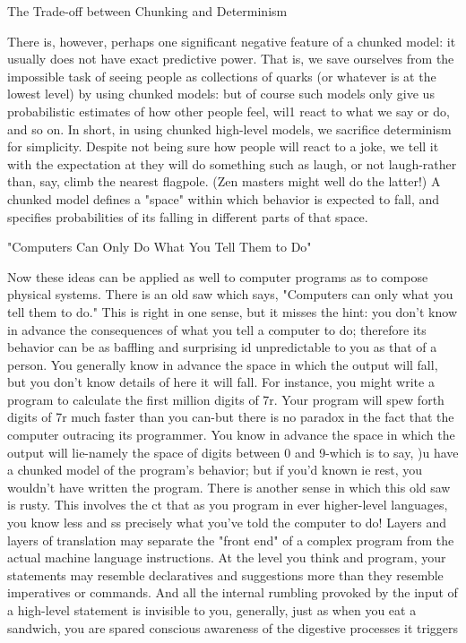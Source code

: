                      The Trade-off between Chunking and Determinism

       There is, however, perhaps one significant negative feature of a chunked model: it
       usually does not have exact predictive power. That is, we save ourselves from the
       impossible task of seeing people as collections of quarks (or whatever is at the
       lowest level) by using chunked models: but of course such models only give us
       probabilistic estimates of how other people feel, wil1 react to what we say or do,
       and so on. In short, in using chunked high-level models, we sacrifice determinism
       for simplicity. Despite not being sure how people will react to a joke, we tell it
       with the expectation at they will do something such as laugh, or not laugh-rather
       than, say, climb the nearest flagpole. (Zen masters might well do the latter!) A
       chunked model defines a "space" within which behavior is expected to fall, and
       specifies probabilities of its falling in different parts of that space.

                   "Computers Can Only Do What You Tell Them to Do"

               Now these ideas can be applied as well to computer programs as to
       compose physical systems. There is an old saw which says, "Computers can only
       what you tell them to do." This is right in one sense, but it misses the hint: you
       don't know in advance the consequences of what you tell a computer to do;
       therefore its behavior can be as baffling and surprising id unpredictable to you as
       that of a person. You generally know in advance the space in which the output
       will fall, but you don't know details of here it will fall. For instance, you might
       write a program to calculate the first million digits of 7r. Your program will spew
       forth digits of 7r much faster than you can-but there is no paradox in the fact that
       the computer outracing its programmer. You know in advance the space in which
       the output will lie-namely the space of digits between 0 and 9-which is to say, )u
       have a chunked model of the program's behavior; but if you'd known ie rest, you
       wouldn't have written the program.
               There is another sense in which this old saw is rusty. This involves the ct
       that as you program in ever higher-level languages, you know less and ss
       precisely what you've told the computer to do! Layers and layers of translation
       may separate the "front end" of a complex program from the actual machine
       language instructions. At the level you think and program, your statements may
       resemble declaratives and suggestions more than they resemble imperatives or
       commands. And all the internal rumbling provoked by the input of a high-level
       statement is invisible to you, generally, just as when you eat a sandwich, you are
       spared conscious awareness of the digestive processes it triggers




